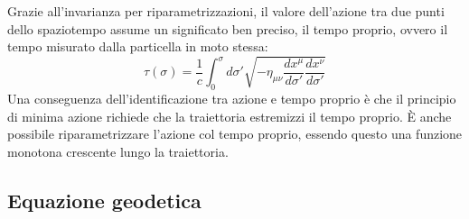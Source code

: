 Grazie all'invarianza per riparametrizzazioni, il valore dell'azione tra due punti dello spaziotempo assume un significato ben preciso, il tempo proprio, ovvero il tempo misurato dalla particella in moto stessa:
\begin{equation}
  \tau(\sigma) = \frac{1}{c} \int_0^{\sigma} d\sigma' \sqrt{- \eta_{\mu \nu} \frac{dx^{\mu}}{d\sigma'} \frac{dx^{\nu}}{d\sigma'}}
  \label{eq:1.13}
\end{equation}
Una conseguenza dell'identificazione tra azione e tempo proprio è che il principio di minima azione richiede che la traiettoria estremizzi il tempo proprio. È anche possibile riparametrizzare l'azione col tempo proprio, essendo questo una funzione monotona crescente lungo la traiettoria.

\subsection{Equazione geodetica}

